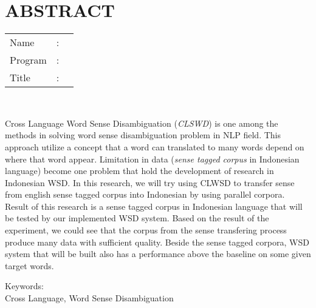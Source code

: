 %
%
%

\chapter*{ABSTRACT}

\vspace*{0.2cm}

\noindent \begin{tabular}{l l p{11.0cm}}
	Name&: & \penulis \\
	Program&: & \programEng \\
	Title&: & \judulInggris \\
\end{tabular} \\ 

\vspace*{0.5cm}

\noindent 
Cross Language Word Sense Disambiguation (\textit{CLSWD}) is one among the methods in solving word sense disambiguation problem in NLP field. This approach utilize a concept that a word can translated to many words depend on where that word appear. Limitation in data (\textit{sense tagged corpus} in Indonesian language) become one problem that hold the development of research in Indonesian WSD. In this research, we will try using CLWSD to transfer sense from english sense tagged corpus into Indonesian by using parallel corpora. Result of this research is a sense tagged corpus in Indonesian language that will be tested by our implemented WSD system. Based on the result of the experiment, we could see that the corpus from the sense transfering process produce many data with sufficient quality. Beside the sense tagged corpora, WSD system that will be built also has a performance above the baseline on some given target words.
\vspace*{0.2cm}

\noindent Keywords: \\ 
\noindent Cross Language, Word Sense Disambiguation

\newpage